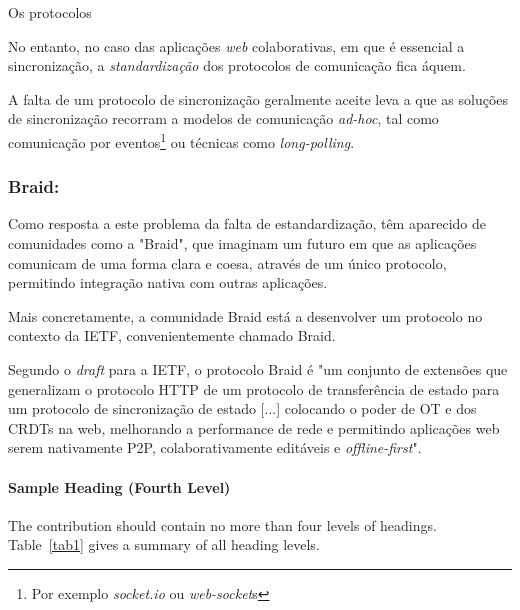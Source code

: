 \documentclass[runningheads]{llncs}
\begin{document}
        Os protocolos 

        No entanto, no caso das aplicações {\itshape web} colaborativas, em que
        é essencial a sincronização, a {\itshape standardização} dos protocolos
        de comunicação fica áquem. 
        
        A falta de um protocolo de sincronização geralmente aceite leva a que as
        soluções de sincronização recorram a modelos de comunicação {\itshape
        ad-hoc}, tal como comunicação por eventos\footnote{Por exemplo {\itshape
        socket.io} ou {\itshape web-socket}s} ou técnicas como {\itshape
        long-polling}. 

        


            \subsubsection{Braid:} Como resposta a este problema da falta de
            estandardização, têm aparecido de comunidades como a "Braid", que
            imaginam um futuro em que as aplicações comunicam de uma forma clara
            e coesa, através de um único protocolo, permitindo integração nativa
            com outras aplicações.

            Mais concretamente, a comunidade Braid está a desenvolver um
            protocolo no contexto da IETF, convenientemente chamado Braid. 

            Segundo o {\itshape draft} para a IETF, o protocolo Braid é "um
            conjunto de extensões que generalizam o protocolo HTTP de um
            protocolo de transferência de estado para um protocolo de
            sincronização de estado [...] colocando o poder de OT e dos CRDTs na
            web, melhorando a performance de rede e permitindo aplicações web
            serem nativamente P2P, colaborativamente editáveis e {\itshape
            offline-first}"\cite{braid-spec}. 


        \paragraph{Sample Heading (Fourth Level)}
        The contribution should contain no more than four levels of headings.
        Table~\ref{tab1} gives a summary of all heading levels.
\end{document}
